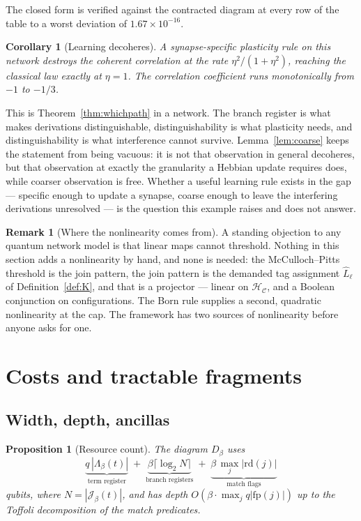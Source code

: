 \documentclass[11pt]{article}
\theoremstyle{definition}
\newtheorem{remark}[definition]{Remark}
\theoremstyle{plain}
\newtheorem{proposition}[definition]{Proposition}
\newtheorem{corollary}[definition]{Corollary}
\newcommand{\Loc}{\Lambda}
\newcommand{\Cfg}{\mathcal{C}}
\newcommand{\Hs}{\mathcal{H}}
\newcommand{\Hc}{\Hs_{\Cfg}}
\newcommand{\Jumps}{\mathcal{J}}
\newcommand{\fp}{\mathrm{fp}}
\begin{document}
The closed form is verified against the contracted diagram at every row of the
table to a worst deviation of $1.67\times 10^{-16}$.

\begin{corollary}[Learning decoheres]\label{cor:learn}
A synapse-specific plasticity rule on this network destroys the coherent
correlation at the rate $\eta^2/(1+\eta^2)$, reaching the classical law exactly
at $\eta = 1$. The correlation coefficient runs monotonically from $-1$ to
$-1/3$.
\end{corollary}

This is Theorem~\ref{thm:whichpath} in a network. The branch register is what
makes derivations distinguishable, distinguishability is what plasticity needs,
and distinguishability is what interference cannot survive. Lemma~\ref{lem:coarse}
keeps the statement from being vacuous: it is not that observation in general
decoheres, but that observation at exactly the granularity a Hebbian update
requires does, while coarser observation is free. Whether a useful learning rule
exists in the gap --- specific enough to update a synapse, coarse enough to
leave the interfering derivations unresolved --- is the question this example
raises and does not answer.

\begin{remark}[Where the nonlinearity comes from]\label{rem:nonlinear}
A standing objection to any quantum network model is that linear maps cannot
threshold. Nothing in this section adds a nonlinearity by hand, and none is
needed: the McCulloch--Pitts threshold is the join pattern, the join pattern is
the demanded tag assignment $\hat{L}_\ell$ of Definition~\ref{def:K}, and that
is a projector --- linear on $\Hc$, and a Boolean conjunction on configurations.
The Born rule supplies a second, quadratic nonlinearity at the cap. The
framework has two sources of nonlinearity before anyone asks for one.
\end{remark}

\section{Costs and tractable fragments}\label{sec:costs}

\subsection{Width, depth, ancillas}

\begin{proposition}[Resource count]\label{prop:resources}
The diagram $D_\beta$ uses
\[
  \underbrace{q\,|\Loc_\beta(t)|}_{\text{term register}} \;+\;
  \underbrace{\beta\lceil\log_2 N\rceil}_{\text{branch registers}} \;+\;
  \underbrace{\beta\,\max_j |\mathrm{rd}(j)|}_{\text{match flags}}
\]
qubits, where $N = |\Jumps_\beta(t)|$, and has depth $O(\beta\cdot\max_j q|\fp(j)|)$ up to the
Toffoli decomposition of the match predicates.
\end{proposition}
\end{document}
